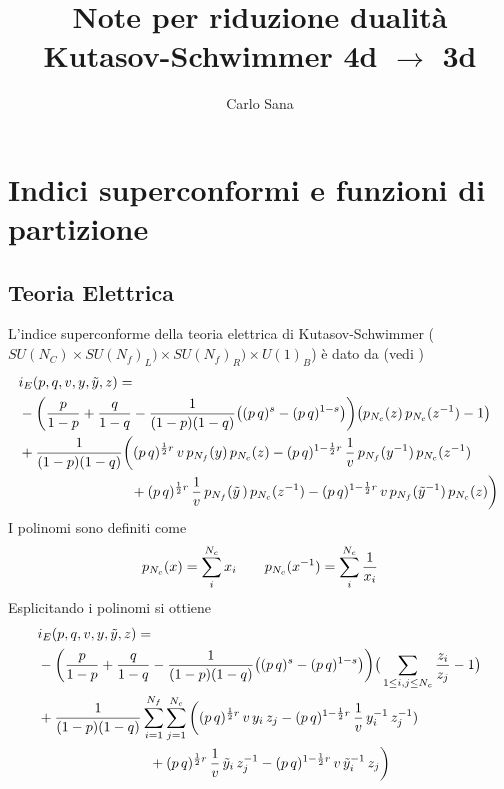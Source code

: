 \documentclass[a4paper,12pt]{report}
\title{Note per riduzione dualità Kutasov-Schwimmer 4d $\rightarrow$ 3d}
\author{Carlo Sana}
\begin{document}
\maketitle
\newpage
\chapter{Indici superconformi e funzioni di partizione}
\section{Teoria Elettrica}
 L'indice superconforme della teoria elettrica di Kutasov-Schwimmer ( $ SU(N_C)  \times SU(N_f)_L)\times SU(N_f)_R)\times  U(1)_B  $) è dato da (vedi \citep{Dolan:2008qi})
 \begin{equation}
\begin{aligned}
& i_E (p,q,v, y,\tilde y ,z) = \\ & -\bigg({p \over 1-p}+{q \over 1-q} -{1 \over (1-p)(1-q)}
\big((p\,q)^{s}- (p\,q)^{1-s}\big)
\bigg) \big( p_{N_c}( z)\, p_{N_c}(z^{-1})-1\big ) \\ 
&{} +{1\over (1-p)(1-q)}\bigg((p\,q)^{{1\over 2}r} \, v \, p_{N_f}(y)\, p_{N_c}(z)
- (p\,q)^{1- {1\over 2}r} \, {1 \over v}\, p_{{N_f}}(y^{-1})\, p_{{N_c}}(z^{-1})\\
&\qquad\qquad\qquad\qquad
+ (p\,q)^{{1\over 2}r}\, {1\over v}\, p_{{N_f}}({\tilde y}\,) \, p_{{N_c}}(z^{-1})
- (p\,q)^{1- {1\over 2}r} \, v\, p_{N_f}({\tilde y}^{-1})\, p_{N_c}(z)\bigg) \,\\
\end{aligned}
\end{equation}
I polinomi sono definiti come
$$
 p_{N_c}({x}) = \sum_i^{N_c} x_i \qquad p_{N_c}({x^{-1}}) =  \sum_i^{N_c} { 1 \over x_i  }
$$
Esplicitando i polinomi si ottiene 
\begin{align*}
& i_E (p,q,v, y,\tilde y ,z) = \\ & -\bigg({p \over 1-p}+{q \over 1-q} -{1 \over (1-p)(1-q)}
\big((p\,q)^{s}- (p\,q)^{1-s}\big)
\bigg) \big(\sum_{1 \leq i,j \leq N_c} {z_i \over z_j} -1\big ) \\ 
&{} +{1\over (1-p)(1-q)}\sum_{i = 1}^{N_f} \sum_{j = 1}^{N_c}\bigg( (p\,q)^{{1\over 2}r} \, v \, y_i \, z_j
- (p\,q)^{1- {1\over 2}r} \, {1 \over v}\,y_i^{-1} \, z_j^{-1})\\
&\qquad\qquad\qquad\qquad
+ (p\,q)^{{1\over 2}r}\, {1\over v}\, \tilde y_i \, z_j^{-1}
- (p\,q)^{1- {1\over 2}r} \, v\, \tilde y_i^{-1}\, z_j\bigg) \,\\
\end{align*}
\end{document}

